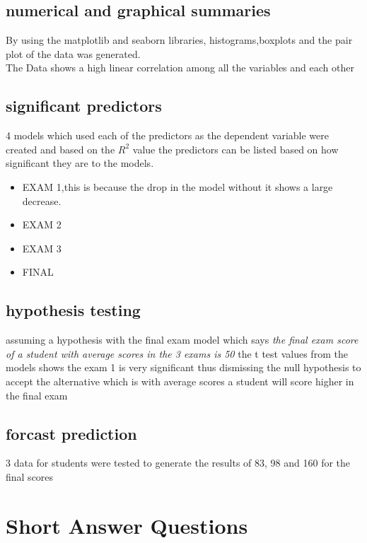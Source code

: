 \documentclass[a4paper,12pt]{report}
\begin{document}
\section{numerical and graphical summaries}
By using the matplotlib and seaborn libraries, histograms,boxplots and the pair plot of the data was generated.\\
The Data shows a high linear correlation among all the variables and each other
\section{significant predictors}
4 models which used each of the predictors as the dependent variable were created and based on the $R^{2}$ value the predictors can be listed based on how significant they are to the models.
\begin{itemize}
	\item EXAM 1,this is because the drop in the model without it shows a large decrease.
	\item EXAM 2
	\item EXAM 3
	\item FINAL 
\end{itemize}
\section{hypothesis testing}
assuming a hypothesis with the final exam model which says \emph{the final exam score of a student with average scores in the 3 exams is 50}
the t test values from the models shows the exam 1 is very significant thus dismissing the null hypothesis to accept the alternative which is with average scores a student will score higher in the final exam
\section{forcast prediction}
3 data for students were tested to generate the results of 83, 98 and 160 for the final scores
\chapter{Short Answer Questions}
\end{document}
